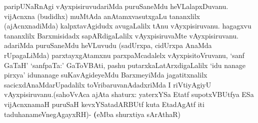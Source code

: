 \begin{artha}
paripUNaRnAgi vAyxpisiruvudariMda puruSaneMdu
heVLalapxDuvanu. vijAcnxna (budidhx) \-muMtAda anAtamxvasutxgaLu
tananxlilx (ajAcnxnadiMda) kalpxtavAgidudx avugaLalilx tAnu
vAyxpisiru\-vanu. hagagxvu tananxlilx Barxmisidadx sapARdigaLalilx
vAyxpisiruvaMte vAyxpisiruvanu. adariMda puruSaneMdu heVLuvudu
(sadUrxpa, cidUrxpa AnaMda rUpagaLiMda) parxtayxgAtamxnu
parxpaMcadalelx vAyxpisitoVruvanu, `sanf GaTaH' `sanfpaTa:' GaToVBAti,
pashu putarxkaLatArxdigaLalilx `idu nanage pirxya' idunanage
suKavAgideyeMdu BarxmeyiMda jagatitxnalilx sacicxdAnaMdarUpadalilx
toVribaruvanAdadxriMda I riVti\-yAgiyU vAyxpisiruvanu.(sahoVvAca ajAta
shaturx: yaterxYSa Etatf supotxV\s \-BUtfya ESa vijAcnxnamaH puruSaH
kevxYSatadARBUtf kuta EtadAgAtf iti \-taduhanameVnegAgayxRH)-
\textbf(eMba shurxtiya sArAthaR)
\end{artha}


